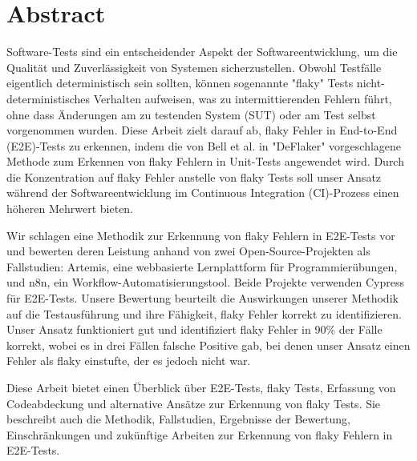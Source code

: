 \chapter{Abstract}

Software-Tests sind ein entscheidender Aspekt der Softwareentwicklung, um die Qualität und Zuverlässigkeit von Systemen sicherzustellen. Obwohl Testfälle eigentlich deterministisch sein sollten, können sogenannte "flaky" Tests nicht-deterministisches Verhalten aufweisen, was zu intermittierenden Fehlern führt, ohne dass Änderungen am zu testenden System (SUT) oder am Test selbst vorgenommen wurden. Diese Arbeit zielt darauf ab, flaky Fehler in End-to-End (E2E)-Tests zu erkennen, indem die von Bell et al. in "DeFlaker" vorgeschlagene Methode zum Erkennen von flaky Fehlern in Unit-Tests angewendet wird. Durch die Konzentration auf flaky Fehler anstelle von flaky Tests soll unser Ansatz während der Softwareentwicklung im Continuous Integration (CI)-Prozess einen höheren Mehrwert bieten.

Wir schlagen eine Methodik zur Erkennung von flaky Fehlern in E2E-Tests vor und bewerten deren Leistung anhand von zwei Open-Source-Projekten als Fallstudien: Artemis, eine webbasierte Lernplattform für Programmierübungen, und n8n, ein Workflow-Automatisierungstool. Beide Projekte verwenden Cypress für E2E-Tests. Unsere Bewertung beurteilt die Auswirkungen unserer Methodik auf die Testausführung und ihre Fähigkeit, flaky Fehler korrekt zu identifizieren. Unser Ansatz funktioniert gut und identifiziert flaky Fehler in 90\% der Fälle korrekt, wobei es in drei Fällen falsche Positive gab, bei denen unser Ansatz einen Fehler als flaky einstufte, der es jedoch nicht war.

Diese Arbeit bietet einen Überblick über E2E-Tests, flaky Tests, Erfassung von Codeabdeckung und alternative Ansätze zur Erkennung von flaky Tests. Sie beschreibt auch die Methodik, Fallstudien, Ergebnisse der Bewertung, Einschränkungen und zukünftige Arbeiten zur Erkennung von flaky Fehlern in E2E-Tests.
